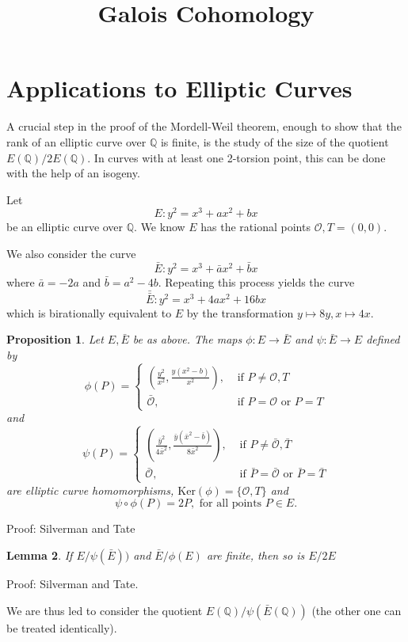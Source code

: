 \documentclass[11pt,a4paper]{amsart}
\title[Galois Cohomology]{Galois Cohomology}
\theoremstyle{plain}
\newtheorem{prop}{Proposition}[section]
\newtheorem{lemma}[prop]{Lemma}
\theoremstyle{definition}
\theoremstyle{remark}
\numberwithin{equation}{section}
\newcommand{\QQ}{{\mathbb Q}}
\newcommand{\OO}{{\mathcal O}}
\newcommand{\1}{{\mathds 1}}
\begin{document}
\section{Applications to Elliptic Curves}
A crucial step in the proof of the Mordell-Weil theorem, enough to show that
the rank of an elliptic curve over $\QQ$ is finite, is the study of the size
of the quotient $E(\QQ) / 2 E(\QQ)$. In curves with at least one 2-torsion
point, this can be done with the help of an isogeny.

Let $$E : y^2 = x^3 + ax^2 + bx$$ be an elliptic curve over $\QQ$. We know $E$
has the rational points $\OO, T = (0,0)$.

We also consider the curve
\[ \bar{E} : y^2 = x^3 + \bar{a}x^2 + \bar{b}x \]
where $\bar{a} = -2a$ and $\bar{b} = a^2 - 4b$. Repeating this process yields
the curve
\[ \bar{\bar{E}} : y^2 = x^3 +  4ax^2 + 16bx\]
which is birationally equivalent to $E$ by the transformation $y \mapsto 8y,
x \mapsto 4x$.

\begin{prop}
  Let $E, \bar{E}$ be as above. The maps $\phi : E \rightarrow \bar{E}$ and
  $\psi : \bar{E} \rightarrow E$ defined by
  \[\phi(P) =
    \begin{cases}
      (\frac{y^2}{x^2}, \frac{y(x^2-b)}{x^2}), & \text{ if } P \neq \OO, T \\
      \bar{\OO}, & \text{ if } P = \OO \text{ or } P = T
    \end{cases}\]
  and
  \[\psi(P) =
    \begin{cases}
      (\frac{\bar{y}^2}{4\bar{x}^2}, \frac{\bar{y}(\bar{x}^2-\bar{b})}{8\bar{x}^2}),
      & \text{ if } P \neq \bar{\OO}, \bar{T} \\
      \bar{\OO}, & \text{ if } \bar{P} = \bar{\OO} \text{ or } \bar{P} = \bar{T}
    \end{cases}\]
  are elliptic curve homomorphisms, $\text{Ker}(\phi) = \{\OO, T\}$ and
  \[ \psi \circ \phi (P) = 2P , \text{ for all points } P \in E.\]
\end{prop}
Proof: Silverman and Tate

\begin{lemma}
  If $E / \psi(\bar{E}))$ and $\bar{E} / \phi(E)$ are finite, then so is $E/2E$
\end{lemma}
Proof: Silverman and Tate. \qedhere

We are thus led to consider the quotient $E(\QQ) / \psi(\bar{E}(\QQ))$ (the
other one can be treated identically).
\end{document}
